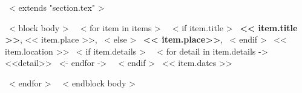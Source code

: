 ~< extends "section.tex" >~

~< block body >~
    ~< for item in items >~
      ~< if item.title >~
      \textbf{<< item.title >>}, << item.place >>,
      ~< else >~
      \textbf{<< item.place>>},
      ~< endif >~
      << item.location >>
        ~< if item.details >~
        ~< for detail in item.details ->~
            <<detail>>
        ~<- endfor ->~
        ~< endif >~
        \hfill << item.dates >> \par
    ~< endfor >~
~< endblock body >~
